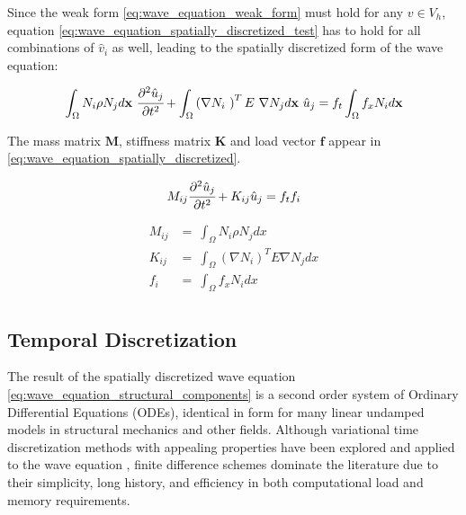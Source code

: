 Since the weak form \ref{eq:wave_equation_weak_form} must hold for any $v \in V_h$, equation \ref{eq:wave_equation_spatially_discretized_test} has to hold for all combinations of $\hat v_i$ as well, leading to the spatially discretized form of the wave equation:

\begin{equation} \label{eq:wave_equation_spatially_discretized}
	\int_{\Omega} N_i \rho N_j d \mathbf x \ \cfrac{\partial^2 \hat u_j}{\partial t^2}
	+
	\int_{\Omega} \left( \nabla N_i \ \right)^T E \ \nabla N_j d \mathbf x \ \hat u_j
	=
	f_t \int_{\Omega} f_x N_i d \mathbf x
\end{equation}

The mass matrix $\mathbf M$, stiffness matrix $\mathbf K$ and load vector $\mathbf f$ appear in \ref{eq:wave_equation_spatially_discretized}.

\begin{equation} \label{eq:wave_equation_structural_components}
M_{ij} \cfrac{\partial^2 \hat u_j}{\partial t^2}
+
K_{ij} \hat u_j
=
f_t f_i
\end{equation}

\begin{equation} \label{eq:structural_components}
	\begin{array}{rl}
		M_{ij} &= \ \int_{\Omega} N_i \rho N_j dx \\
		K_{ij} &= \ \int_{\Omega} \left( \nabla N_i \right)^T E \nabla N_j dx \\
		f_{i}  &= \ \int_{\Omega} f_x N_i dx \\
	\end{array}
\end{equation}

\subsection{Temporal Discretization}
\label{subsection:wave_equation_temporal_discretization}

The result of the spatially discretized wave equation \ref{eq:wave_equation_structural_components} is a second order system of Ordinary Differential Equations (ODEs), identical in form for many linear undamped models in structural mechanics and other fields. Although variational time discretization methods with appealing properties have been explored \cite{Zhao2014} and applied to the wave equation \cite{Kocher2014}, finite difference schemes dominate the literature due to their simplicity, long history, and efficiency in both computational load and memory requirements.

